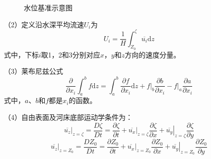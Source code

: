 \begin{figure}
  \begin{tikzpicture}
  \end{tikzpicture}
  \caption{水位基准示意图}
\end{figure}

（2）定义沿水深平均流速$U_i$为
\begin{equation}
  U_i
  =
  \frac{1}{H}
\int_{Z_{0}}^{\zeta}\!\overline{u_{i}}\mathrm{d}z
\end{equation}
式中，下标$i$取1，2和3分别对应$x$，$y$和$z$方向的速度分量。

（3）莱布尼兹公式
\begin{equation}
  \frac{\partial}{\partial x_{i}}
  \int_{a}^{b}\!f\mathrm{d}z
  =
  \int_{a}^{b}\!
  \frac{\partial f}{\partial x_{i}}\mathrm{d}z
  +
  \left.f\right|_{b}\frac{\partial b}{\partial x_{i}}
  -
  \left.f\right|_{a}\frac{\partial a}{\partial x_{i}}
\end{equation}
式中，$a$、$b$和$f$都是$x_{i}$的函数。

（4）自由表面及河床底部运动学条件为：
\begin{equation}
  \left.\overline{u_{z}}\right|_{z=\zeta}
    =
    \frac{D\zeta}{Dt}
    =
    \frac{\partial\zeta}{\partial t}
    +
    \left.\overline{u_{x}}\right|_{z=\zeta}\frac{\partial\zeta}{\partial x}
      +
    \left.\overline{u_{y}}\right|_{z=\zeta}\frac{\partial\zeta}{\partial y}
\end{equation}
\begin{equation}
  \left.\overline{u_{z}}\right|_{z=Z_{0}}
    =
    \frac{DZ_{0}}{Dt}
    =
    \frac{\partial Z_{0}}{\partial t}
    +
    \left.\overline{u_{x}}\right|_{z=Z_{0}}\frac{\partial Z_{0}}{\partial x}
      +
    \left.\overline{u_{y}}\right|_{z=Z_{0}}\frac{\partial Z_{0}}{\partial y}
\end{equation}

